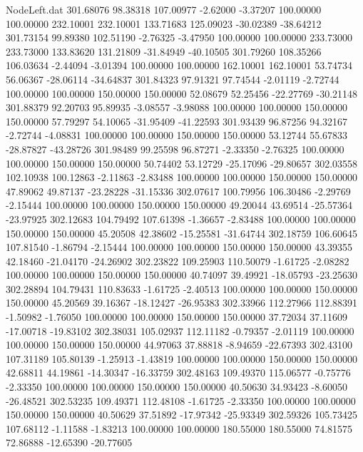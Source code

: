 \begin{filecontents}{NodeLeft.dat}
 301.68076   98.38318  107.00977    -2.62000   -3.37207  100.00000  100.00000  232.10001  232.10001  133.71683  125.09023  -30.02389  -38.64212
 301.73154   99.89380  102.51190    -2.76325   -3.47950  100.00000  100.00000  233.73000  233.73000  133.83620  131.21809  -31.84949  -40.10505
 301.79260  108.35266  106.03634    -2.44094   -3.01394  100.00000  100.00000  162.10001  162.10001   53.74734   56.06367  -28.06114  -34.64837
 301.84323   97.91321   97.74544    -2.01119   -2.72744  100.00000  100.00000  150.00000  150.00000   52.08679   52.25456  -22.27769  -30.21148
 301.88379   92.20703   95.89935    -3.08557   -3.98088  100.00000  100.00000  150.00000  150.00000   57.79297   54.10065  -31.95409  -41.22593
 301.93439   96.87256   94.32167    -2.72744   -4.08831  100.00000  100.00000  150.00000  150.00000   53.12744   55.67833  -28.87827  -43.28726
 301.98489   99.25598   96.87271    -2.33350   -2.76325  100.00000  100.00000  150.00000  150.00000   50.74402   53.12729  -25.17096  -29.80657
 302.03558  102.10938  100.12863    -2.11863   -2.83488  100.00000  100.00000  150.00000  150.00000   47.89062   49.87137  -23.28228  -31.15336
 302.07617  100.79956  106.30486    -2.29769   -2.15444  100.00000  100.00000  150.00000  150.00000   49.20044   43.69514  -25.57364  -23.97925
 302.12683  104.79492  107.61398    -1.36657   -2.83488  100.00000  100.00000  150.00000  150.00000   45.20508   42.38602  -15.25581  -31.64744
 302.18759  106.60645  107.81540    -1.86794   -2.15444  100.00000  100.00000  150.00000  150.00000   43.39355   42.18460  -21.04170  -24.26902
 302.23822  109.25903  110.50079    -1.61725   -2.08282  100.00000  100.00000  150.00000  150.00000   40.74097   39.49921  -18.05793  -23.25630
 302.28894  104.79431  110.83633    -1.61725   -2.40513  100.00000  100.00000  150.00000  150.00000   45.20569   39.16367  -18.12427  -26.95383
 302.33966  112.27966  112.88391    -1.50982   -1.76050  100.00000  100.00000  150.00000  150.00000   37.72034   37.11609  -17.00718  -19.83102
 302.38031  105.02937  112.11182    -0.79357   -2.01119  100.00000  100.00000  150.00000  150.00000   44.97063   37.88818   -8.94659  -22.67393
 302.43100  107.31189  105.80139    -1.25913   -1.43819  100.00000  100.00000  150.00000  150.00000   42.68811   44.19861  -14.30347  -16.33759
 302.48163  109.49370  115.06577    -0.75776   -2.33350  100.00000  100.00000  150.00000  150.00000   40.50630   34.93423   -8.60050  -26.48521
 302.53235  109.49371  112.48108    -1.61725   -2.33350  100.00000  100.00000  150.00000  150.00000   40.50629   37.51892  -17.97342  -25.93349
 302.59326  105.73425  107.68112    -1.11588   -1.83213  100.00000  100.00000  180.55000  180.55000   74.81575   72.86888  -12.65390  -20.77605

\end{filecontents}
